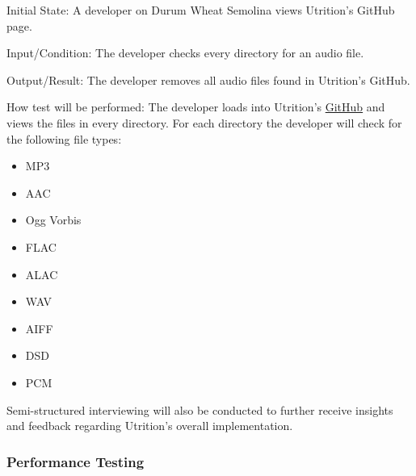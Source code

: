 \documentclass[12pt, titlepage]{article}
\begin{document}
\begin{enumerate}
		Initial State: A developer on Durum Wheat Semolina views Utrition’s GitHub page. 
		
		Input/Condition: The developer checks every directory for an audio file.
		
		Output/Result: The developer removes all audio files found in Utrition’s GitHub.
		
		How test will be performed: The developer loads into Utrition’s \href{https://github.com/jeff-rey-wang/utrition/}{GitHub} and views the files in every directory. For each directory the developer will check for the following file types:
		
		\begin{itemize}
			\item MP3
			\item AAC
			\item Ogg Vorbis
			\item FLAC
			\item ALAC
			\item WAV
			\item AIFF
			\item DSD
			\item PCM
		\end{itemize}
	\end{enumerate}

	Semi-structured interviewing will also be conducted to further receive insights and feedback regarding Utrition's overall implementation.
	
	\subsubsection{Performance Testing}
	
	
\end{document}
